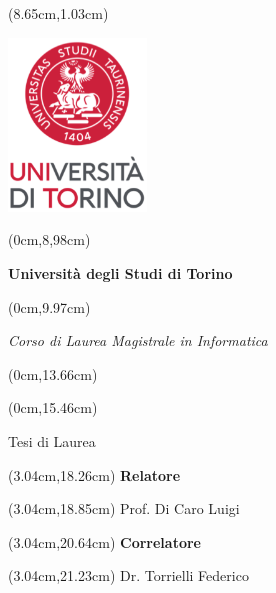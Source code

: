 \documentclass[
  a4paper, twoside, 10pt, titlepage]{book}
\author{}
\date{}
\begin{document}
\frontmatter

\frontmatter

\thispagestyle{empty}

\begingroup


\begin{textblock*}{4cm}(8.65cm,1.03cm)
	\centerline {\includegraphics[width=3.67cm]{src/res/unito_logo.png}}
\end{textblock*}


\begin{textblock*}{21cm}(0cm,8,98cm)
	\fontsize{18}{22}\selectfont
	\centerline {\textbf{ Universit\`a degli Studi di Torino}}
\end{textblock*}
\begin{textblock*}{21cm}(0cm,9.97cm)
	\fontsize{18}{22}\selectfont
	\centerline {\textit{Corso di Laurea Magistrale in Informatica}}
\end{textblock*}


\begin{textblock*}{21cm}(0cm,13.66cm)
	\fontsize{20}{24}\selectfont
  \centerline  {\textbf{}}
\end{textblock*}
\begin{textblock*}{21cm}(0cm,15.46cm)
	\fontsize{18}{22}\selectfont
	\centerline{\Large {Tesi di Laurea}}
\end{textblock*}



\fontsize{14}{17}\selectfont

\begin{textblock*}{8cm}(3.04cm,18.26cm)
	\noindent
	\textbf{Relatore}
\end{textblock*}
\begin{textblock*}{8cm}(3.04cm,18.85cm)
	\noindent
	Prof. Di Caro Luigi
\end{textblock*}

\begin{textblock*}{8cm}(3.04cm,20.64cm)
	\noindent
	\textbf{Correlatore}
\end{textblock*}
\begin{textblock*}{8cm}(3.04cm,21.23cm)
	\noindent
	Dr. Torrielli Federico
\end{textblock*}
\end{document}
